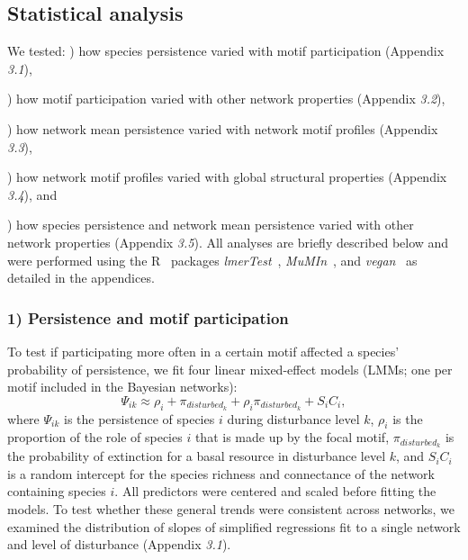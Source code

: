 \documentclass[12pt]{article}
\begin{document}
\begin{spacing}{2.0}
	\subsection*{Statistical analysis} 

	We tested:
	) how species persistence varied with motif participation (Appendix \emph{3.1}), 
	
	) how motif participation varied with other network properties (Appendix \emph{3.2}), 
	
	) how network mean persistence varied with network motif profiles (Appendix \emph{3.3}), 
	
	) how network motif profiles varied with global structural properties (Appendix \emph{3.4}), and 
	
	) how species persistence and network mean persistence varied with other network properties (Appendix \emph{3.5}). 
	All analyses are briefly described below and were performed using the R~\citep{R} packages \emph{lmerTest}~\citep{lmerTest}, \emph{MuMIn}~\citep{MuMIn}, and \emph{vegan}~\citep{vegan} as detailed in the appendices.

    
    \subsubsection*{1) Persistence and motif participation}

        To test if participating more often in a certain motif affected a species' probability of persistence, we fit four linear mixed-effect models (LMMs; one per motif included in the Bayesian networks):
            \begin{equation}
                \Psi_{ik} \approx \rho_{i} + \pi_{disturbed_k} + \rho_{i}\pi_{disturbed_k} +
                S_{i}C_{i} ,
                \label{propreq}
            \end{equation}
        \noindent where $\Psi_{ik}$ is the persistence of species $i$ during disturbance level $k$, $\rho_{i}$ is the proportion of the role of species $i$ that is made up by the focal motif, $\pi_{disturbed_k}$ is the probability of extinction for a basal resource in disturbance level $k$, and $S_{i}C_{i}$ is a random intercept for the species richness and connectance of the network containing species $i$.
        All predictors were centered and scaled before fitting the models.         
        To test whether these general trends were consistent across networks, we examined the distribution of slopes of simplified regressions fit to a single network and level of disturbance (Appendix \emph{3.1}).
    

\end{spacing}
\end{document}
